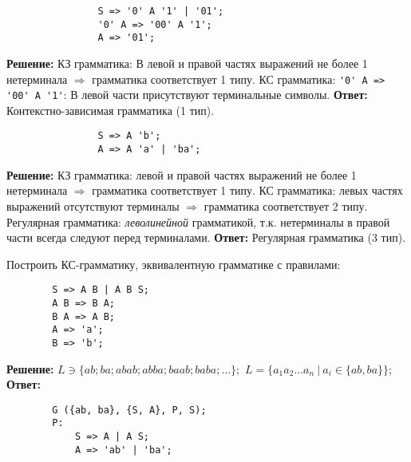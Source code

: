 \documentclass[]{article}
\begin{document}
\begin{enumerate}
\begin{item}
\begin{enumerate}
        \begin{item}
            \begin{lstlisting}
                S => '0' A '1' | '01';
                '0' A => '00' A '1';
                A => '01';
            \end{lstlisting}
            \bigbreak
            \textbf{Решение:}
            \smallbreak
            КЗ грамматика:
            \hfill\break В левой и правой частях выражений не более 1 нетерминала $\Rightarrow$ грамматика соответствует 1 типу.
            \smallbreak
            КС грамматика:
            \hfill\break \lstinline|'0' A => '00' A '1'|: В левой части присутствуют терминальные символы.
            \bigbreak
            \textbf{Ответ:}
            Контекстно-зависимая грамматика (1 тип).
        \end{item}

        \begin{item}
            \begin{lstlisting}
                S => A 'b';
                A => A 'a' | 'ba';
            \end{lstlisting}
            \bigbreak
            \textbf{Решение:}
            \smallbreak
            КЗ грамматика:
            \hfill{} левой и правой частях выражений не более 1 нетерминала $\Rightarrow$ грамматика соответствует 1 типу.
            \smallbreak
            КС грамматика:
            \hfill{} левых частях выражений отсутствуют терминалы $\Rightarrow$ грамматика соответствует 2 типу.
            \smallbreak
            Регулярная грамматика:
            \hfill{} \emph{леволинейной} грамматикой, т.к. нетерминалы в правой части всегда следуют перед терминалами.
            \bigbreak
            \textbf{Ответ:}
            Регулярная грамматика (3 тип).
        \end{item}

    \end{enumerate}
\end{item}

\begin{item}
    Построить КС-грамматику, эквивалентную грамматике с правилами:
    \begin{lstlisting}
        S => A B | A B S;
        A B => B A;
        B A => A B;
        A => 'a';
        B => 'b';
    \end{lstlisting}

    \textbf{Решение:}
    \smallbreak
    $L \ni \{ ab; ba; abab; abba; baab; baba; \dots \};$
    \hfill\break$L = \{ a_1 a_2 \dots a_n \ |\  a_i \in \{ ab, ba \} \};$
    \bigbreak
    \textbf{Ответ:}
    \begin{lstlisting}
        G ({ab, ba}, {S, A}, P, S);
        P:
            S => A | A S;
            A => 'ab' | 'ba';
    \end{lstlisting}
\end{item}


\end{enumerate}
\end{document}

